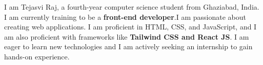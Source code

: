 
I am Tejasvi Raj, a fourth-year computer science student from Ghaziabad, India. I am currently training to be a \textbf{front-end developer}.I am passionate about creating web applications. I am proficient in HTML, CSS, and JavaScript, and I am also proficient with frameworks like \textbf{Tailwind CSS and React JS}. I am eager to learn new technologies and I am actively seeking an internship to gain hands-on experience.